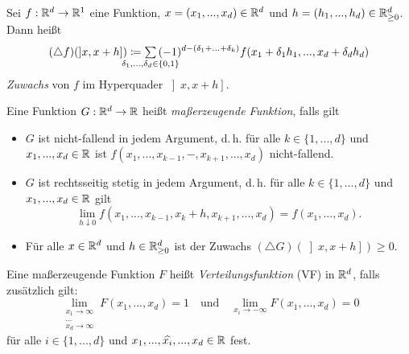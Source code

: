 \documentclass{cheat-sheet}
\newcommand{\Ring}{\mathfrak{R}} %
\begin{document}

\begin{defn}
  Sei $f : \mathbb{R}^d \to \mathbb{R}^1$ eine Funktion, $x = (x_1, ..., x_d) \in \mathbb{R}^d$ und $h = (h_1, ..., h_d) \in \mathbb{R}_{\geq 0}^d$. Dann heißt
  \[ (\triangle f)(\left] x, x + h \right]) \coloneqq \sum_{\mathclap{\delta_1, ..., \delta_d \in \{0,1\}}} \, (-1)^{d-(\delta_1 + ... + \delta_k)} f(x_1 + \delta_1 h_1, ..., x_d + \delta_d h_d) \]
  \emph{Zuwachs} von $f$ im Hyperquader $\left] x, x+h \right]$.
\end{defn}

\begin{defn}
  Eine Funktion $G : \mathbb{R}^d \to \mathbb{R}$ heißt \emph{maßerzeugende Funktion}, falls gilt
  \begin{itemize}
    \item $G$ ist nicht-fallend in jedem Argument, d.\,h. für alle $k \in \{ 1, ..., d \}$ und $x_1, ..., x_d \in \mathbb{R}$ ist $f(x_1, ..., x_{k-1}, -, x_{k+1}, ..., x_d)$ nicht-fallend.
    \item $G$ ist rechtsseitig stetig in jedem Argument, d.\,h. für alle $k \in \{ 1, ..., d \}$ und $x_1, ..., x_d \in \mathbb{R}$ gilt
    \[ \lim_{h \downarrow 0} f(x_1, ..., x_{k-1}, x_k + h, x_{k+1}, ..., x_d) = f(x_1, ..., x_d). \]
    \item Für alle $x \in \mathbb{R}^d$ und $h \in \mathbb{R}_{\geq 0}^d$ ist der Zuwachs $(\triangle G)(\left] x, x + h \right]) \geq 0$.
  \end{itemize}
\end{defn}


\begin{defn}
  Eine maßerzeugende Funktion $F$ heißt \emph{Verteilungsfunktion} (VF) in $\mathbb{R}^d$, falls zusätzlich gilt:
  \[
    \lim_{\substack{x_1 \to \infty \\ ... \\ x_d \to \infty}} F(x_1, ..., x_d) = 1
    \quad \text{und} \quad
    \lim_{x_i \to -\infty} F(x_1, ..., x_d) = 0
  \]
  für alle $i \in \{ 1, ..., d \}$ und $x_1, ..., \widehat{x_i}, ..., x_d \in \mathbb{R}$ fest.
\end{defn}



\iffalse
\begin{satz}
  Sei $\Ring$ ein Ring und $\mu$ ein Inhalt. Es gelten für $n \in \N$ und $A_1, ..., A_n \in \Ring$ die Ein- und Ausschlussformeln
  \begin{align*}
    \mu(A_1 \cup ... \cup A_n) &= \sum_{k=1}^n (-1)^{k-1} \quad \sum_{\mathclap{1 \leq i_1 < ... < i_k \leq n}} \quad \mu(A_{i_1} \cap ... \cap A_{i_k}), \\
    \mu(A_1 \cap ... \cap A_n) &= \sum_{k=1}^n (-1)^{k-1} \quad \sum_{\mathclap{1 \leq i_1 < ... < i_k \leq n}} \quad \mu(A_{i_1} \cup ... \cup A_{i_k}).
  \end{align*}
\end{satz}
\fi
\end{document}
